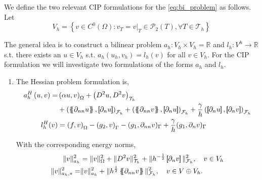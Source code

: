 We define the two relevant CIP formulations for the \eqref{eq:bi_problem} as follows. Let $$V_{h} = \left\{ v \in C^{0}\left( \Omega  \right): v_{T} = v | _{T} \in \mathcal{P} _{2}\left( T \right), \forall T \in
\mathcal{T}_{h}    \right\}$$

The general idea is to construct a bilinear problem $a_{h}: V_{h} \times  V_{h} = \mathbb{R} $ and $l_{h}: V^{h} \to \mathbb{R} $ s.t. there exists an $u \in V_{h}$ s.t. $a_{h}( u_{h}, v_{h}) = l_{h}( v) $ for all $v \in V_{h}$. For the CIP
formulation we will investigate two formulations of the forms $a_{h}$ and $l_{h}$.

\begin{enumerate}[label=\arabic*)]
    \item The Hessian problem formulation is,
\begin{equation}
    \label{eq:cip_biharmonic_form}
\begin{split}
a_{h}^{H} \left( u, v \right)   =&
    \left( \alpha  u, v \right) _{\Omega }   +  \left( D^2 u, D^2v \right) _{\mathcal{T} _{h}} \\
 & +
  \left( \mean{  \partial _{n n} u }, \jump{ \partial _{n }u} \right)_{\mathcal{F}_{h}}  +
 \left( \mean{ \partial _{n n} v }, \jump{ \partial _{n}u }      \right)_{\mathcal{F}_{h}}  + \frac{\gamma }{h}  \left( \jump{ \partial _{n} u}, \jump{ \partial _{n} v   }   \right)_{\mathcal{F}_{h}} \\
 l_{h}^{H}( v) & =  \left( f, v \right) _{\Omega }  - \left(g_{2}, v  \right) _{\Gamma } - ( g_{1}, \partial _{nn} v)_{\Gamma } +  \frac{\gamma }{h} ( g_{1} , \partial _{n} v)_{\Gamma }
\end{split}
\end{equation}

With the corresponding energy norms,
\begin{equation}
\label{eq:a_cip_energy_norm}
    \begin{split}
 \| v \|_{ a_{h} }^{ 2 }& =  \| v\|_{ \Omega  }^{2  }  +  \| D ^2 v \|_{ \mathcal{T} _{h}  }^{ 2 }  + \|  h^{-\frac{1}{2}} \jump{ \partial _{n} v    }\|_{  \mathcal{F} _{h} }^{2  },  \quad v \in V_{h}  \\
   \| v \|_{ a_{h},* }^{ 2 } =& \| v \|_{ a_{h} }^{ 2 }  + \| h^{\frac{1}{2}}  \mean{     \partial _{nn } v}  \|_{ \mathcal{F}_{h}   }^{  2}, \quad  v\in V \oplus V_{h}.
    \end{split}
\end{equation}



\end{enumerate}
